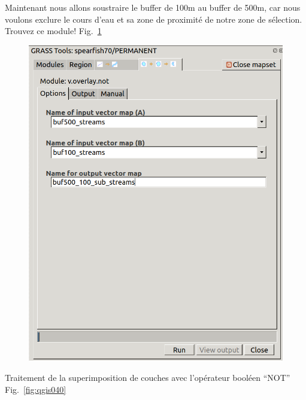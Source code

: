 Maintenant nous allons soustraire le buffer de 100m au buffer de 500m, car nous voulons exclure le cours d'eau et sa zone de proximit\'e de notre zone de s\'election. Trouvez ce module! Fig.~\ref{fig:qgis039}

\begin{figure}[htbp]
   \centering
   \includegraphics[scale=0.3]{qgis039.png}
   \caption{}
   \label{fig:qgis039}
\end{figure}

Traitement de la superimposition de couches avec l'op\'erateur bool\'een ``NOT'' Fig.~\ref{fig:qgis040}

